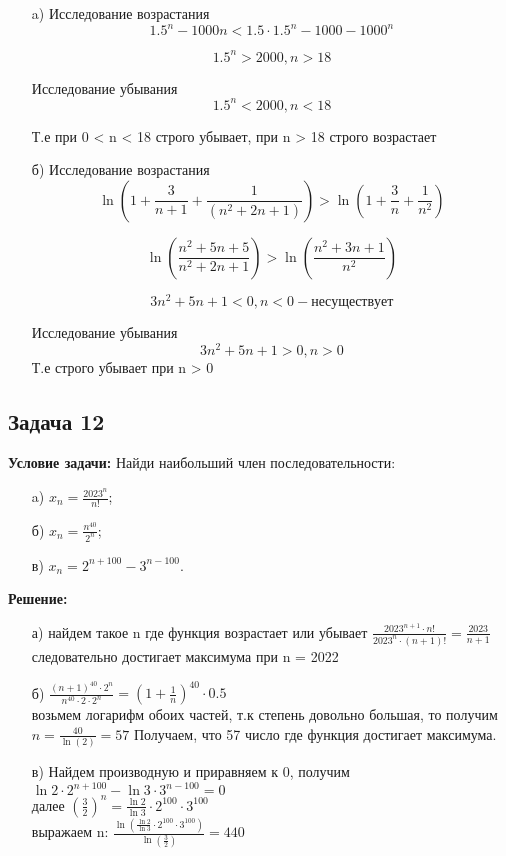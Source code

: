 \documentclass[a4paper,12pt]{article}
\begin{document}
\begin{itemize}
    \item[a) ] Исследование возрастания \[
    1.5^n-1000n<1.5\cdot 1.5^n-1000-1000^n
    \]

    \[
    1.5^n>2000, n>18
    \]  

    Исследование убывания \[
    1.5^n<2000, n < 18
    \]

    Т.е при 0 < n < 18 строго убывает, при n > 18 строго возрастает
    \item[б) ] Исследование возрастания \[
    \ln(1+\frac{3}{n+1}+\frac{1}{(n^2+2n+1)}) > \ln(1+\frac{3}{n}+\frac{1}{n^2})
    \]

    \[
    \ln(\frac{n^2+5n+5}{n^2+2n+1})>\ln(\frac{n^2+3n+1}{n^2})
    \]
    
    \[
    3n^2+5n+1<0, n < 0 - не существует
    \]

    Исследование убывания\[
    3n^2+5n+1>0, n > 0
    \]
    Т.е строго убывает при n > 0
\end{itemize}

\vspace{1cm}

\subsection{Задача 12}
\textbf{Условие задачи:}
Найди наибольший член последовательности:
\begin{itemize}
    \item[a)] \(x_n = \frac{2023^n}{n!}\);
    \item[б)] \(x_n = \frac{n^{40}}{2^n}\);
    \item[в)] \(x_n = 2^{n+100} - 3^{n-100}\).
\end{itemize}

\textbf{Решение: }
\begin{itemize}
    \item[а)] найдем такое n где функция возрастает или убывает $\frac{2023^{n+1}\cdot n!}{2023^n\cdot (n+1)!}=\frac{2023}{n+1}$ следовательно достигает максимума при n = 2022
    \item[б)] $\frac{(n+1)^{40}\cdot 2^n}{n^{40}\cdot 2\cdot 2^{n}}=(1+\frac{1}{n})^{40}\cdot 0.5$ \\
    возьмем логарифм обоих частей, т.к степень довольно большая, то получим $n=\frac{40}{\ln(2)}=57$ Получаем, что 57 число где функция достигает максимума.
    \item[в)] Найдем производную и приравняем к 0, получим $\ln 2 \cdot 2^{n+100} - \ln 3 \cdot 3^{n-100} = 0$\\
    далее $\left(\frac{3}{2}\right)^n = \frac{\ln 2}{\ln 3} \cdot 2^{100} \cdot 3^{100}$\\
    выражаем n: $\frac{\ln\left(\frac{\ln 2}{\ln 3} \cdot 2^{100} \cdot 3^{100}\right)}{\ln\left(\frac{3}{2}\right)} = 440$
\end{itemize}
\end{document}
